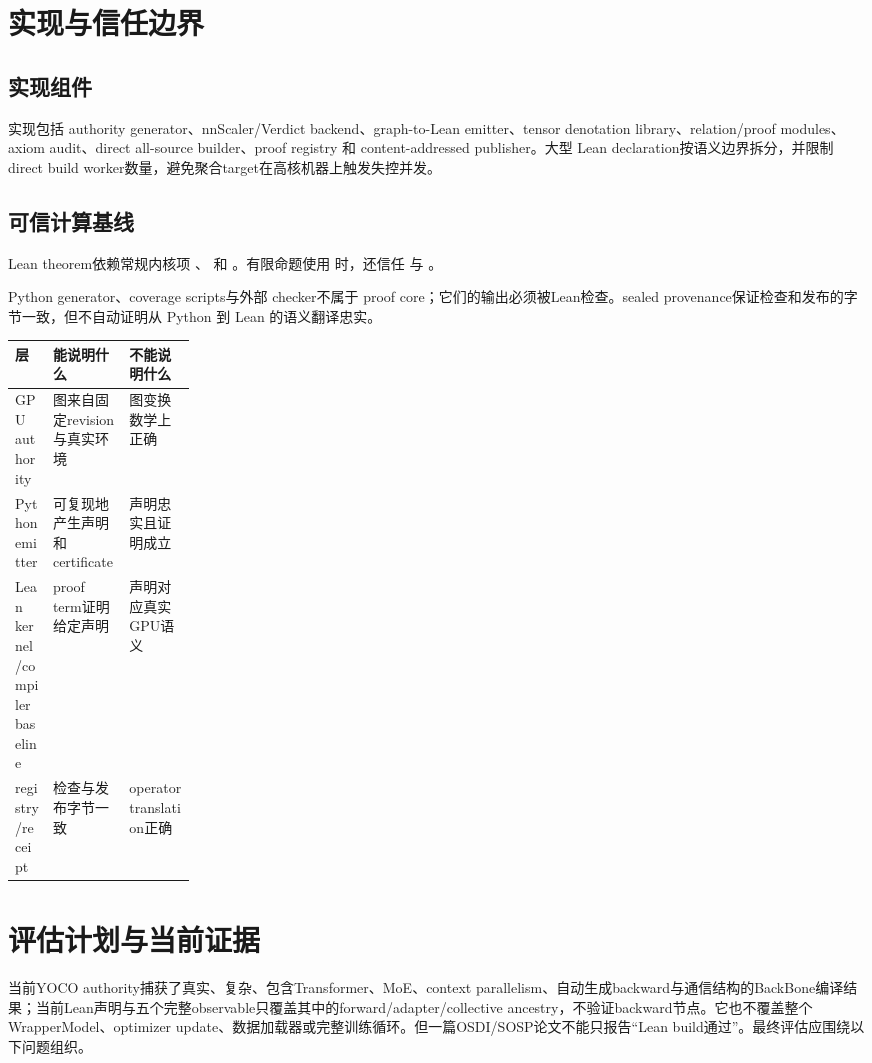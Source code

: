 \documentclass[10.5pt,a4paper]{ctexart}
\begin{document}
\section{实现与信任边界}

\subsection{实现组件}

实现包括 authority generator、nnScaler/Verdict backend、graph-to-Lean emitter、tensor denotation library、relation/proof modules、axiom audit、direct all-source builder、proof registry 和 content-addressed publisher。大型 Lean declaration按语义边界拆分，并限制 direct build worker数量，避免聚合target在高核机器上触发失控并发。

\subsection{可信计算基线}

Lean theorem依赖常规内核项 、 和 。有限命题使用  时，还信任  与 。

Python generator、coverage scripts与外部 checker不属于 proof core；它们的输出必须被Lean检查。sealed provenance保证检查和发布的字节一致，但不自动证明从 Python 到 Lean 的语义翻译忠实。

\begin{table}[h]
\centering\small
\begin{tabularx}{\linewidth}{p{0.21\linewidth}X X}
\toprule
层 & 能说明什么 & 不能说明什么 \\
\midrule
GPU authority & 图来自固定revision与真实环境 & 图变换数学上正确 \\
Python emitter & 可复现地产生声明和certificate & 声明忠实且证明成立 \\
Lean kernel/compiler baseline & proof term证明给定声明 & 声明对应真实GPU语义 \\
registry/receipt & 检查与发布字节一致 & operator translation正确 \\
\bottomrule
\end{tabularx}
\end{table}

\section{评估计划与当前证据}

当前YOCO authority捕获了真实、复杂、包含Transformer、MoE、context parallelism、自动生成backward与通信结构的BackBone编译结果；当前Lean声明与五个完整observable只覆盖其中的forward/adapter/collective ancestry，不验证backward节点。它也不覆盖整个WrapperModel、optimizer update、数据加载器或完整训练循环。但一篇OSDI/SOSP论文不能只报告“Lean build通过”。最终评估应围绕以下问题组织。
\end{document}
